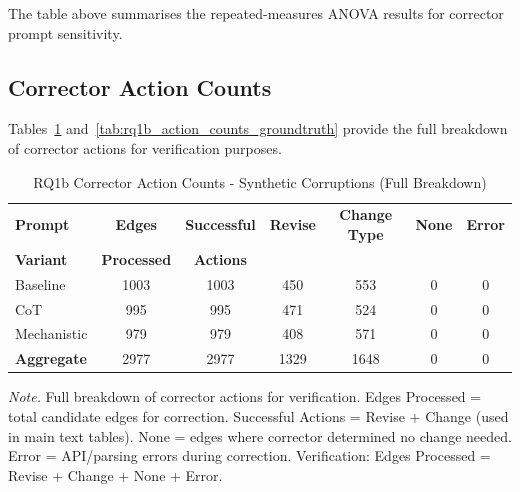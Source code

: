 \documentclass[class=Thesis]{standalone}
\begin{document}
The table above summarises the repeated-measures ANOVA results for corrector prompt sensitivity.

\subsection{Corrector Action Counts}
\label{app:corrector_action_counts}

Tables~\ref{tab:rq1b_action_counts_synthetic} and~\ref{tab:rq1b_action_counts_groundtruth} provide the full breakdown of corrector actions for verification purposes.

\begin{table}[H]
\centering
\caption{RQ1b Corrector Action Counts - Synthetic Corruptions (Full Breakdown)}
\label{tab:rq1b_action_counts_synthetic}
\begin{threeparttable}
\begin{tabular}{lcccccc}
\toprule
\textbf{Prompt} & \textbf{Edges} & \textbf{Successful} & \textbf{Revise} & \textbf{Change Type} & \textbf{None} & \textbf{Error} \\
\textbf{Variant} & \textbf{Processed} & \textbf{Actions} & & & & \\
\midrule
Baseline & 1003 & 1003 & 450 & 553 & 0 & 0 \\
CoT & 995 & 995 & 471 & 524 & 0 & 0 \\
Mechanistic & 979 & 979 & 408 & 571 & 0 & 0 \\
\midrule
\textbf{Aggregate} & 2977 & 2977 & 1329 & 1648 & 0 & 0 \\
\bottomrule
\end{tabular}
\begin{tablenotes}
\small
\item \textit{Note.} Full breakdown of corrector actions for verification. 
Edges Processed = total candidate edges for correction.
Successful Actions = Revise + Change (used in main text tables).
None = edges where corrector determined no change needed.
Error = API/parsing errors during correction.
Verification: Edges Processed = Revise + Change + None + Error.
\end{tablenotes}
\end{threeparttable}
\end{table}
\end{document}
